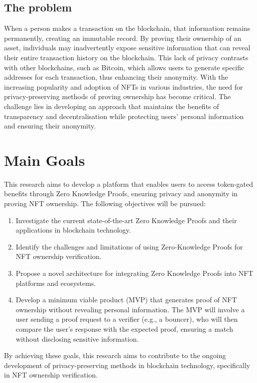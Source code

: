 \subsection{The problem}
When a person makes a transaction on the blockchain, that information remains permanently, creating an immutable record. By proving their ownership of an asset, individuals may inadvertently expose sensitive information that can reveal their entire transaction history on the blockchain. This lack of privacy contrasts with other blockchains, such as Bitcoin, which allows users to generate specific addresses for each transaction, thus enhancing their anonymity. With the increasing popularity and adoption of NFTs in various industries, the need for privacy-preserving methods of proving ownership has become critical. The challenge lies in developing an approach that maintains the benefits of transparency and decentralisation while protecting users' personal information and ensuring their anonymity.

\section{Main Goals}
This research aims to develop a platform that enables users to access token-gated benefits through Zero Knowledge Proofs, ensuring privacy and anonymity in proving NFT ownership. The following objectives will be pursued:

\begin{enumerate}
\item Investigate the current state-of-the-art Zero Knowledge Proofs and their applications in blockchain technology.
\item Identify the challenges and limitations of using Zero-Knowledge Proofs for NFT ownership verification.
\item Propose a novel architecture for integrating Zero Knowledge Proofs into NFT platforms and ecosystems.
\item Develop a minimum viable product (MVP) that generates proof of NFT ownership without revealing personal information. The MVP will involve a user sending a proof request to a verifier (e.g., a bouncer), who will then compare the user's response with the expected proof, ensuring a match without disclosing sensitive information.
\end{enumerate}

By achieving these goals, this research aims to contribute to the ongoing development of privacy-preserving methods in blockchain technology, specifically in NFT ownership verification.

